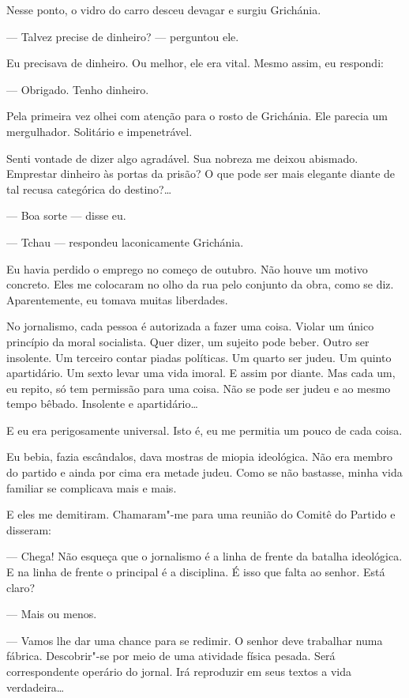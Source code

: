 Nesse ponto, o vidro do carro desceu devagar e surgiu Grichánia.

--- Talvez precise de dinheiro? --- perguntou ele.

Eu precisava de dinheiro. Ou melhor, ele era vital. Mesmo assim, eu
respondi:

--- Obrigado. Tenho dinheiro.

Pela primeira vez olhei com atenção para o rosto de Grichánia. Ele
parecia um mergulhador. Solitário e impenetrável.

Senti vontade de dizer algo agradável. Sua nobreza me deixou abismado.
Emprestar dinheiro às portas da prisão? O que pode ser mais elegante diante de tal recusa categórica do destino?\ldots{}

--- Boa sorte --- disse eu.

--- Tchau --- respondeu laconicamente Grichánia.

\bigskip

Eu havia perdido o emprego no começo de outubro. Não houve um motivo
concreto. Eles me colocaram no olho da rua pelo conjunto da obra, como
se diz. Aparentemente, eu tomava muitas liberdades.

No jornalismo, cada pessoa é autorizada a fazer uma coisa. Violar um \label{ref2}
único princípio da moral socialista. Quer dizer, um sujeito pode beber.
Outro ser insolente. Um terceiro contar piadas políticas. Um quarto ser
judeu. Um quinto apartidário. Um sexto levar uma vida imoral. E assim
por diante. Mas cada um, eu repito, só tem permissão para uma coisa. Não
se pode ser judeu e ao mesmo tempo bêbado. Insolente e apartidário\ldots{}

E eu era perigosamente universal. Isto é, eu me permitia um pouco de
cada coisa.

Eu bebia, fazia escândalos, dava mostras de miopia ideológica. Não era
membro do partido e ainda por cima era metade judeu. Como se não
bastasse, minha vida familiar se complicava mais e mais.

E eles me demitiram. Chamaram"-me para uma reunião do Comitê do Partido e
disseram:

--- Chega! Não esqueça que o jornalismo é a linha de frente da batalha
ideológica. E na linha de frente o principal é a disciplina. É isso que
falta ao senhor. Está claro?

--- Mais ou menos.

--- Vamos lhe dar uma chance para se redimir. O senhor deve trabalhar
numa fábrica. Descobrir"-se por meio de uma atividade física pesada. Será
correspondente operário do jornal. Irá reproduzir em seus textos a vida
verdadeira\ldots{}


